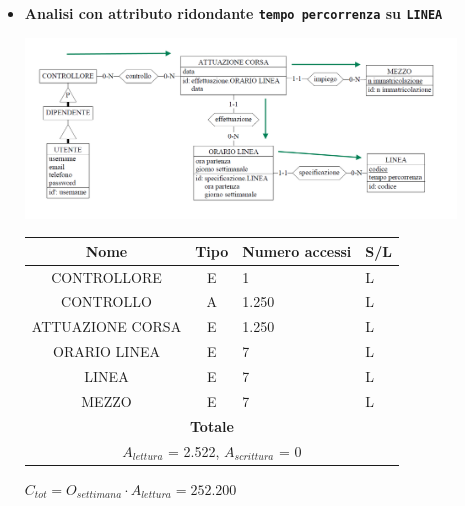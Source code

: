 \documentclass[12pt,a4paper]{report}
\begin{document}
\begin{enumerate}[label=\textbf{\arabic*}]
    \begin{itemize}
    \item \textbf{Analisi con attributo ridondante \texttt{tempo percorrenza} su \texttt{LINEA}}
    \begin{center}
    \includegraphics[width=0.9\textwidth]{VisualOrarioControlloriRid}
    \end{center}
    \begin{table}[H]
    \centering
    \begin{tabular}{|c|c|l|l|}
    \hline
    \textbf{Nome} & \textbf{Tipo} & \textbf{Numero accessi} & \textbf{S/L} \\
    \hline
    CONTROLLORE & E & 1 & L \\
    \hline
    CONTROLLO & A & 1.250 & L \\
    \hline
    ATTUAZIONE CORSA & E & 1.250 & L \\
    \hline
    ORARIO LINEA & E & 7 & L \\
    \hline
    LINEA & E & 7 & L \\
    \hline
    MEZZO & E & 7 & L \\
   \hline
    \multicolumn{4}{c}{\textbf{Totale}} \\
    \multicolumn{4}{c}{${A_{lettura}}$ = 2.522, ${A_{scrittura}}$ = 0} \\
    \hline
    \end{tabular}
    \end{table}
    \begin{center}
    ${C_{tot} = {O_{settimana}}\cdot{A_{lettura}}= 252.200}$
    \end{center}


\end{itemize}
\end{enumerate}
\end{document}
